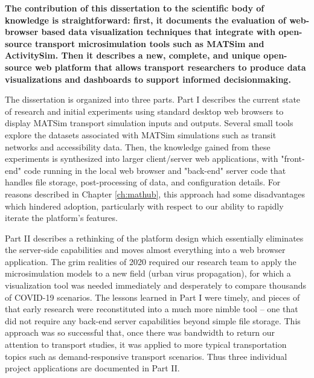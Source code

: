 \textbf{The contribution of this dissertation to the scientific body of knowledge is straightforward: first, it documents the evaluation of web-browser based data visualization techniques that integrate with open-source transport microsimulation tools such as MATSim and ActivitySim. Then it describes a new, complete, and unique open-source web platform that allows transport researchers to produce data visualizations and dashboards to support informed decisionmaking.}

The dissertation is organized into three parts. Part I describes the current state of research and initial experiments using standard desktop web browsers to display MATSim transport simulation inputs and outputs. Several small tools explore the datasets associated with MATSim simulations such as transit networks and accessibility data. Then, the knowledge gained from these experiments is synthesized into larger client/server web applications, with "front-end" code running in the local web browser and "back-end" server code that handles file storage, post-processing of data, and configuration details. For reasons described in Chapter \ref{ch:mathub}, this approach had some disadvantages which hindered adoption, particularly with respect to our ability to rapidly iterate the platform's features.

Part II describes a rethinking of the platform design which essentially eliminates the server-side capabilities and moves almost everything into a web browser application. The grim realities of 2020 required our research team to apply the microsimulation models to a new field (urban virus propagation), for which a visualization tool was needed immediately and desperately to compare thousands of COVID-19 scenarios. The lessons learned in Part I were timely, and pieces of that early research were reconstituted into a much more nimble tool -- one that did not require any back-end server capabilities beyond simple file storage. This approach was so successful that, once there was bandwidth to return our attention to transport studies, it was applied to more typical transportation topics such as demand-responsive transport scenarios. Thus three individual project applications are documented in Part II.

